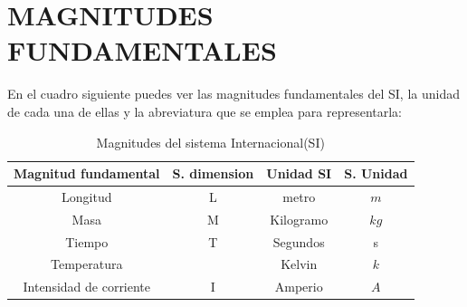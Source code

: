 \documentclass[12pt]{article}
\begin{document}
 
 
 
 
 \section{MAGNITUDES FUNDAMENTALES}
 En el cuadro siguiente puedes ver las magnitudes fundamentales del SI, la unidad de cada una de ellas y la abreviatura que se emplea para representarla:
 

 
 \begin{table}[h]
\begin{center}
\begin{tabular}{ c| c| c|  c }
Magnitud fundamental& S. dimension  & Unidad SI & S. Unidad \\ \hline
Longitud & L& metro & $m$ \\
Masa  &M& Kilogramo & $kg$ \\
Tiempo &T& Segundos & s \\
Temperatura & & Kelvin &$k$\\
Intensidad de corriente &I& Amperio & $A$\\

\hline
\end{tabular}
\caption{Magnitudes del sistema Internacional(SI)}
\label{tab:Magnitudes del sistema internacional SI}
\end{center}
\end{table}
 
 
 
\end{document}
